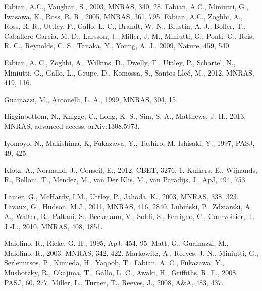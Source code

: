 \documentclass[useAMS,usenatbib]{sam}
\begin{document}
\begin{thebibliography}{99}
     Fabian, A.C., Vaughan, S., 2003, MNRAS, 340, 28.
     Fabian, A.C., Miniutti, G., Iwasawa, K., Ross, R. R., 2005, MNRAS, 361, 795.
     Fabian, A.C., Zoghbi, A., Ross, R. R., Uttley, P., Gallo, L. C., Brandt, W. N., Blustin, A. J.,
    Boller, T., Caballero-Garcia, M. D., Larsson, J., Miller, J. M., Miniutti, G., Ponti, G., Reis, R. C., Reynolds, C. S., Tanaka, Y., Young, A. J., 2009, Nature, 459,
    540.
	
     Fabian, A. C., Zoghbi, A., Wilkins, D., Dwelly, T., Uttley, P., Schartel, N., Miniutti, G., Gallo,
    L., Grupe, D., Komossa, S., Santos-Lleó, M., 2012, MNRAS, 419, 116.
    
     Guainazzi, M., Antonelli, L. A., 1999, MNRAS, 304, 15.

     Higginbottom, N., Knigge, C., Long, K. S., Sim, S. A., Matthews, J. H., 2013, MNRAS,
    advanced  access: arXiv:1308.5973.
    
     Iyomoyo, N., Makishima, K, Fukazawa, Y., Tashiro, M. Ishisaki, Y., 1997, PASJ, 49, 425.
    
     Klotz, A., Normand, J., Conseil, E., 2012, CBET, 3276, 1.
     Kulkers, E., Wijnands, R., Belloni, T., Mendez, M., van Der Klis, M., van Paradijs, J., ApJ, 494,
    753.
    
     Lamer, G., McHardy, I.M., Uttley, P., Jahoda, K., 2003, MNRAS, 338, 323.
     Lavaux, G., Hudson, M.J., 2011, MNRAS, 416, 2840.
     Lubi\'{n}ski, P., Zdziarski, A. A., Walter, R., Paltani, S., Beckmann, V., Soldi, S.,
    Ferrigno, C., Courvoisier, T. J.-L., 2010, MNRAS, 408, 1851.

     Maiolino, R., Rieke, G. H., 1995, ApJ, 454, 95.
     Matt, G., Guainazzi, M., Maiolino, R., 2003, MNRAS, 342, 422.
     Markowitz, A., Reeves, J. N., Miniutti, G., Serlemitsos, P., Kunieda, H., Yaqoob, T., Fabian, A.
    C., Fukazawa, Y., Mushotzky, R., Okajima, T., Gallo, L. C., Awaki, H., Griffiths, R. E., 2008, PASJ, 60, 277.
     Miller, L., Turner, T., Reeves, J., 2008, A\&A, 483, 437.
    

\end{thebibliography}
\end{document}

